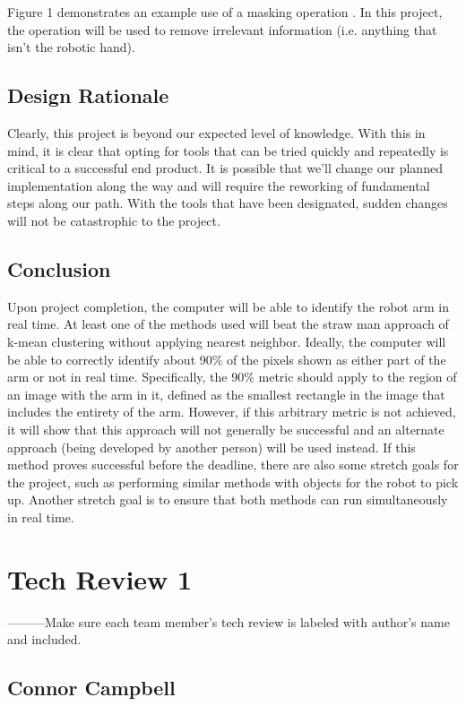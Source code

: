 \documentclass[10pt,journal,compsoc, draftclsnofoot,onecolumn]{IEEEtran}
\begin{document}
\noindent
Figure 1 demonstrates an example use of a masking operation \cite{2:online}.
In this project, the operation will be used to remove irrelevant information (i.e. anything that isn't the robotic hand). 

\subsection{Design Rationale}
Clearly, this project is beyond our expected level of knowledge.
With this in mind, it is clear that opting for tools that can be tried quickly and repeatedly is critical to a successful end product.
It is possible that we'll change our planned implementation along the way and will require the reworking of fundamental steps along our path.
With the tools that have been designated, sudden changes will not be catastrophic to the project.

\subsection{Conclusion}
Upon project completion, the computer will be able to identify the robot arm in real time.
At least one of the methods used will beat the straw man approach of k-mean clustering without applying nearest neighbor.
Ideally, the computer will be able to correctly identify about 90\% of the pixels shown as either part of the arm or not in real time.
Specifically, the 90\% metric should apply to the region of an image with the arm in it, defined as the smallest rectangle in the image that includes the entirety of the arm.
However, if this arbitrary metric is not achieved, it will show that this approach will not generally be successful and an alternate approach (being developed by another person) will be used instead.
If this method proves successful before the deadline, there are also some stretch goals for the project, such as performing similar methods with objects for the robot to pick up.
Another stretch goal is to ensure that both methods can run simultaneously in real time.


\newpage
\section{Tech Review 1}
---------Make sure each team member's tech review is labeled with author's name and included.
\subsection{Connor Campbell}
\end{document}
